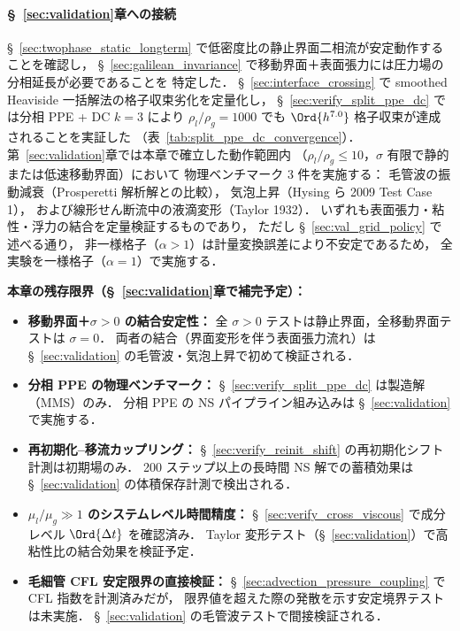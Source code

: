 \paragraph{§~\ref{sec:validation}章への接続}

§~\ref{sec:twophase_static_longterm} で低密度比の静止界面二相流が安定動作することを確認し，
§~\ref{sec:galilean_invariance} で移動界面＋表面張力には圧力場の分相延長が必要であることを
特定した．
§~\ref{sec:interface_crossing} で smoothed Heaviside 一括解法の格子収束劣化を定量化し，
§~\ref{sec:verify_split_ppe_dc} では分相 PPE + DC $k{=}3$ により
$\rho_l/\rho_g = 1000$ でも $\Ord{h^{7.0}}$ 格子収束が達成されることを実証した
（表~\ref{tab:split_ppe_dc_convergence}）．
第~\ref{sec:validation}章では本章で確立した動作範囲内
（$\rho_l/\rho_g \leq 10$，$\sigma$ 有限で静的または低速移動界面）において
物理ベンチマーク 3 件を実施する：
毛管波の振動減衰（Prosperetti 解析解との比較），
気泡上昇（Hysing ら 2009 Test Case 1），
および線形せん断流中の液滴変形（Taylor 1932）．
いずれも表面張力・粘性・浮力の結合を定量検証するものであり，
ただし §~\ref{sec:val_grid_policy} で述べる通り，
非一様格子（$\alpha > 1$）は計量変換誤差により不安定であるため，
全実験を一様格子（$\alpha = 1$）で実施する．

\noindent\textbf{本章の残存限界（§~\ref{sec:validation}章で補完予定）：}
\begin{itemize}[noitemsep]
  \item \textbf{移動界面＋$\sigma > 0$ の結合安定性：}
        全 $\sigma > 0$ テストは静止界面，全移動界面テストは $\sigma = 0$．
        両者の結合（界面変形を伴う表面張力流れ）は
        §~\ref{sec:validation} の毛管波・気泡上昇で初めて検証される．
  \item \textbf{分相 PPE の物理ベンチマーク：}
        §~\ref{sec:verify_split_ppe_dc} は製造解（MMS）のみ．
        分相 PPE の NS パイプライン組み込みは §~\ref{sec:validation} で実施する．
  \item \textbf{再初期化--移流カップリング：}
        §~\ref{sec:verify_reinit_shift} の再初期化シフト計測は初期場のみ．
        200 ステップ以上の長時間 NS 解での蓄積効果は
        §~\ref{sec:validation} の体積保存計測で検出される．
  \item \textbf{$\mu_l/\mu_g \gg 1$ のシステムレベル時間精度：}
        §~\ref{sec:verify_cross_viscous} で成分レベル $\Ord{\Delta t}$ を確認済み．
        Taylor 変形テスト（§~\ref{sec:validation}）で高粘性比の結合効果を検証予定．
  \item \textbf{毛細管 CFL 安定限界の直接検証：}
        §~\ref{sec:advection_pressure_coupling} で CFL 指数を計測済みだが，
        限界値を超えた際の発散を示す安定境界テストは未実施．
        §~\ref{sec:validation} の毛管波テストで間接検証される．
\end{itemize}

